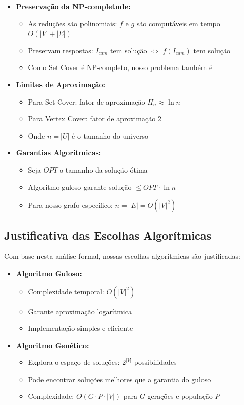 \documentclass[12pt, a4paper]{report}
\begin{document}
\begin{itemize}
    \item \textbf{Preservação da NP-completude:}
    \begin{itemize}
        \item As reduções são polinomiais: $f$ e $g$ são computáveis em tempo $O(|V| + |E|)$
        \item Preservam respostas: $I_{cam}$ tem solução $\iff$ $f(I_{cam})$ tem solução
        \item Como Set Cover é NP-completo, nosso problema também é
    \end{itemize}
    
    \item \textbf{Limites de Aproximação:}
    \begin{itemize}
        \item Para Set Cover: fator de aproximação $H_n \approx \ln n$
        \item Para Vertex Cover: fator de aproximação 2
        \item Onde $n = |U|$ é o tamanho do universo
    \end{itemize}
    
    \item \textbf{Garantias Algorítmicas:}
    \begin{itemize}
        \item Seja $OPT$ o tamanho da solução ótima
        \item Algoritmo guloso garante solução $\leq OPT \cdot \ln n$
        \item Para nosso grafo específico: $n = |E| = O(|V|^2)$
    \end{itemize}
\end{itemize}

\subsection{Justificativa das Escolhas Algorítmicas}
Com base nesta análise formal, nossas escolhas algorítmicas são justificadas:

\begin{itemize}
    \item \textbf{Algoritmo Guloso:}
    \begin{itemize}
        \item Complexidade temporal: $O(|V|^2)$
        \item Garante aproximação logarítmica
        \item Implementação simples e eficiente
    \end{itemize}
    
    \item \textbf{Algoritmo Genético:}
    \begin{itemize}
        \item Explora o espaço de soluções: $2^{|V|}$ possibilidades
        \item Pode encontrar soluções melhores que a garantia do guloso
        \item Complexidade: $O(G \cdot P \cdot |V|)$ para $G$ gerações e população $P$
    \end{itemize}
\end{itemize}
\end{document}

